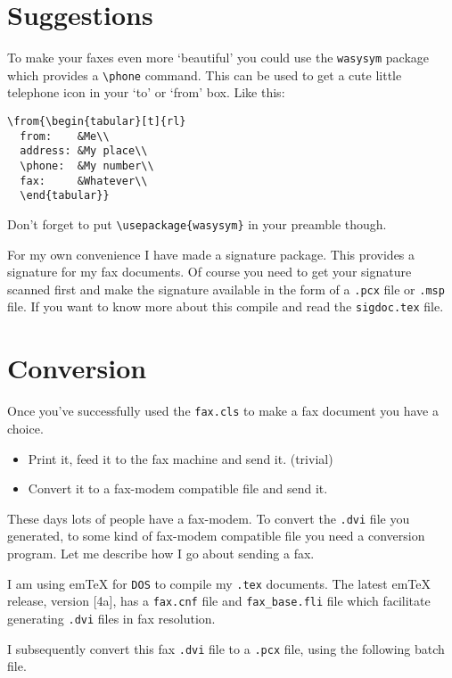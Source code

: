 \documentclass[oldtoc,a4paper,10pt]{artikel3}
\begin{document}
\section{Suggestions}
To make your faxes even more `beautiful' you could use the {\tt wasysym}
package which provides a \verb|\phone| command. This can be used to get a
cute little telephone icon in your `to' or `from' box. Like this:
\begin{verbatim}
\from{\begin{tabular}[t]{rl}
  from:    &Me\\
  address: &My place\\
  \phone:  &My number\\
  fax:     &Whatever\\
  \end{tabular}}
\end{verbatim}
Don't forget to put \verb|\usepackage{wasysym}| in your preamble though.

For my own convenience I have made a signature package. This provides a
signature for my fax documents. Of course you need to get your signature
scanned first and make the signature available in the form of a {\tt .pcx}
file or {\tt .msp} file. If you want to know more about this compile and
read the {\tt sigdoc.tex} file.

\section{Conversion}
Once you've successfully used the {\tt fax.cls} to make a fax document you
have a choice.

\begin{itemize}
\item Print it, feed it to the fax machine and send it. (trivial)
\item Convert it to a fax-modem compatible file and send it.
\end{itemize}

These days lots of people have a fax-modem. To convert the {\tt .dvi} file
you generated, to some kind of fax-modem compatible file you need a
conversion program. Let me describe how I go about sending a fax.

I am using em\TeX{} for {\tt DOS} to compile my {\tt .tex} documents. The
latest em\TeX{} release, version [4a], has a {\tt fax.cnf} file and
\verb|fax_base.fli| file which facilitate generating {\tt .dvi} files in fax
resolution.

I subsequently convert this fax {\tt .dvi} file to a {\tt .pcx} file, using
the following batch file.
\end{document}
